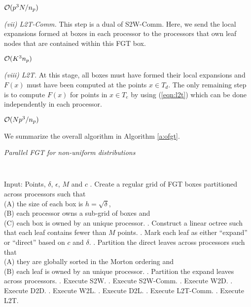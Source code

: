 \hfill $\mathcal{O}(p^3 N / n_p)$

{\em (vii) L2T-Comm.} This step is a dual of S2W-Comm. Here, we send the local expansions formed at boxes in each processor 
to the processors that own leaf nodes that are contained within this FGT box. 

\hfill $\mathcal{O}(K^3 n_p)$

{\em (viii) L2T.} At this stage, all boxes must have formed their local expansions and $F(x)$ must have been computed at the points $x \in T_d$. The only remaining step is to compute $F(x)$ for points in $x \in T_e$ by using (\ref{eqn:l2t}) which can be done independently in each processor. 

\hfill $\mathcal{O}(N p^3/n_p)$

We summarize the overall algorithm in Algorithm \ref{a:ofgt}.  

\begin{algorithm}[!h]
\caption{ \label{a:ofgt}
\em Parallel FGT for non-uniform distributions}
{\tt
\begin{algorithmic}
\STATE Input: Points, $\delta$, $\epsilon$, $M$ and $c$
. Create a regular grid of FGT boxes partitioned across processors such that \\
 (A) the size of each box is $h = \sqrt{\delta}$, \\
 (B) each processor owns a sub-grid of boxes and \\
 (C) each box is owned by an unique processor. 
. Construct a linear octree such that each leaf contains fewer than $M$ points. 
. Mark each leaf as either ``expand'' or ``direct'' based on $c$ and $\delta$.
. Partition the direct leaves across processors such that \\
  (A) they are globally sorted in the Morton ordering and \\
  (B) each leaf is owned by an unique processor.
. Partition the expand leaves across processors. 
. Execute S2W.
. Execute S2W-Comm.
. Execute W2D.
. Execute D2D.
. Execute W2L.
. Execute D2L.
. Execute L2T-Comm.
. Execute L2T.
\end{algorithmic}
}
\end{algorithm}


